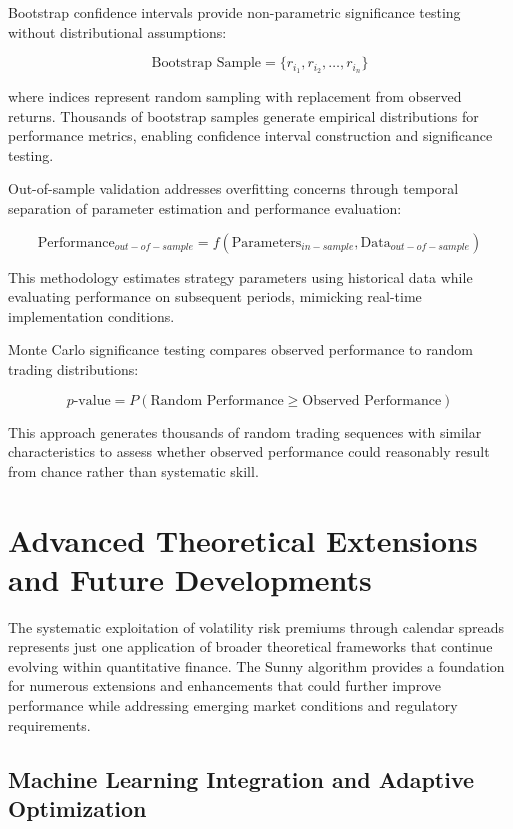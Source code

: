 \documentclass[
  american,
  11pt,
  11pt,
  letterpaper,
  onecolumn]{article}
\begin{document}
Bootstrap confidence intervals provide non-parametric significance
testing without distributional assumptions:

\[\text{Bootstrap Sample} = \{r_{i_1}, r_{i_2}, \ldots, r_{i_n}\}\]

where indices represent random sampling with replacement from observed
returns. Thousands of bootstrap samples generate empirical distributions
for performance metrics, enabling confidence interval construction and
significance testing.

Out-of-sample validation addresses overfitting concerns through temporal
separation of parameter estimation and performance evaluation:

\[\text{Performance}_{out-of-sample} = f(\text{Parameters}_{in-sample}, \text{Data}_{out-of-sample})\]

This methodology estimates strategy parameters using historical data
while evaluating performance on subsequent periods, mimicking real-time
implementation conditions.

Monte Carlo significance testing compares observed performance to random
trading distributions:

\[p\text{-value} = P(\text{Random Performance} \geq \text{Observed Performance})\]

This approach generates thousands of random trading sequences with
similar characteristics to assess whether observed performance could
reasonably result from chance rather than systematic skill.

\section{Advanced Theoretical Extensions and Future
Developments}\label{advanced-theoretical-extensions-and-future-developments}

The systematic exploitation of volatility risk premiums through calendar
spreads represents just one application of broader theoretical
frameworks that continue evolving within quantitative finance. The Sunny
algorithm provides a foundation for numerous extensions and enhancements
that could further improve performance while addressing emerging market
conditions and regulatory requirements.

\subsection{Machine Learning Integration and Adaptive
Optimization}\label{machine-learning-integration-and-adaptive-optimization}
\end{document}
